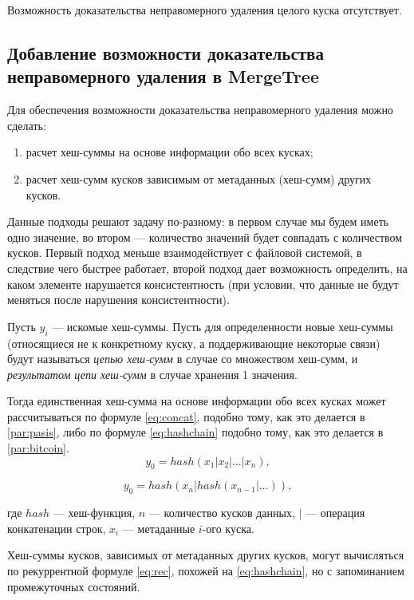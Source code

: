 Возможность доказательства неправомерного удаления целого куска отсутствует.

\subsection{Добавление возможности доказательства неправомерного удаления в MergeTree}

Для обеспечения возможности доказательства неправомерного удаления можно сделать:
\begin{enumerate}
	\item расчет хеш-суммы на основе информации обо всех кусках;
	\item расчет хеш-сумм кусков зависимым от метаданных (хеш-сумм) других кусков.
\end{enumerate}

Данные подходы решают задачу по-разному: в первом случае мы будем иметь одно значение, во втором --- количество значений будет совпадать с количеством кусков. Первый подход меньше взаимодействует с файловой системой, в следствие чего быстрее работает, второй подход дает возможность определить, на каком элементе нарушается консистентность (при условии, что данные не будут меняться после нарушения консистентности).

Пусть $y_i$ --- искомые хеш-суммы. Пусть для определенности новые хеш-суммы (относящиеся не к конкретному куску, а поддерживающие некоторые связи) будут называться \textit{цепью хеш-сумм} в случае со множеством хеш-сумм, и \textit{результатом цепи хеш-сумм} в случае хранения 1 значения.

Тогда единственная хеш-сумма на основе информации обо всех кусках может рассчитываться по формуле \ref{eq:concat}, подобно тому, как это делается в \ref{par:pasis}, либо по формуле \ref{eq:hashchain} подобно тому, как это делается в \ref{par:bitcoin}.
\begin{equation}
\label{eq:concat}
y_0 = hash(x_1 | x_2 | ... | x_n),
\end{equation}

\begin{equation}
\label{eq:hashchain}
y_0 = hash(x_n | hash(x_{n-1} | ...)),
\end{equation}

где $hash$ --- хеш-функция, $n$ --- количество кусков данных, $|$ --- операция конкатенации строк, $x_i$ --- метаданные $i$-ого куска.

Хеш-суммы кусков, зависимых от метаданных других кусков, могут вычисляться по рекуррентной формуле \ref{eq:rec}, похожей на \ref{eq:hashchain}, но с запоминанием промежуточных состояний.

